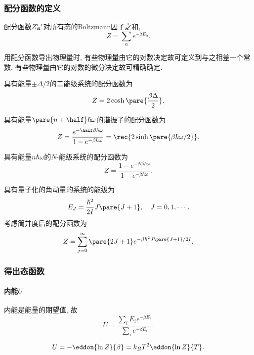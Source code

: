 \documentclass[../Thermal.tex]{subfiles}
\begin{document}
\subsubsection{配分函数的定义}
\begin{definition}[单粒子配分函数]
配分函数$Z$是对所有态的Boltzmann因子之和,
\[ Z = \sum_\alpha e^{-\beta E_\alpha}. \]
\end{definition}
\begin{remark}
用配分函数导出物理量时, 有些物理量由它的对数决定故可定义到与之相差一个常数, 有些物理量由它的对数的微分决定故可精确确定.
\end{remark}
\begin{ex}
\label{ex:twolevelsystem}
具有能量$\pm \Delta/2$的二能级系统的配分函数为
\begin{equation}
\label{eq:bipartition}
Z = 2\cosh\pare{\frac{\beta\Delta}{2}}.
\end{equation}
\end{ex}
\begin{ex}
\label{ex:harmonic}
具有能量$\pare{n+\half}\hbar\omega$的谐振子的配分函数为
\[ Z = \frac{e^{-\half \beta \hbar \omega}}{1-e^{-\beta\hbar\omega}} = \rec{2\sinh \pare{\beta\hbar\omega/2}}. \]
\end{ex}
\begin{ex}
具有能量$n\hbar\omega$的$N$-能级系统的配分函数为
\begin{equation}
\label{eq:harmonicpartition}
Z = \frac{1-e^{-N\beta\hbar\omega}}{1-e^{-\beta\hbar\omega}}.
\end{equation}
\end{ex}
\begin{ex}
\label{ex:quantumangularmomentum}
具有量子化的角动量的系统的能级为
\[ E_J = \frac{\hbar^2}{2I}J\pare{J+1}, \quad J = 0,1,\cdots. \]
考虑简并度后的配分函数为
\begin{equation}
\label{eq:rotationpartition}
Z = \sum_{j=0}^\infty \pare{2J+1}e^{-\beta \hbar^2J\pare{J+1}/2I}.
\end{equation}
\end{ex}
\subsubsection{得出态函数}
\label{statefunctionsbypartitionfunction}
\paragraph{内能$U$} 内能是能量的期望值, 故
\[ U = \frac{\sum_i E_i e^{-\beta E_i}}{\sum_i e^{-\beta E_i}}. \]
\begin{finale}
\[ U = -\eddon{\ln Z}{\beta} = k_BT^2 \eddon{\ln Z}{T}. \]
\end{finale}
\end{document}

